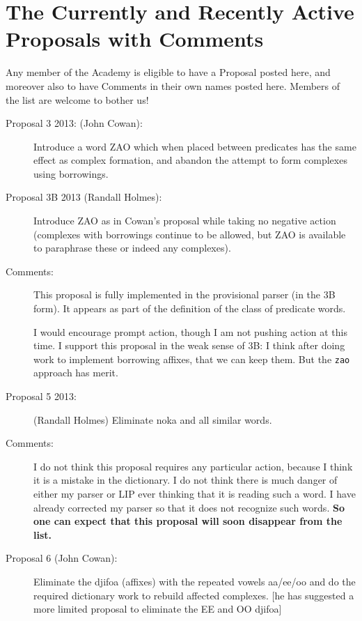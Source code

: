 \documentclass[12pt]{article}
\begin{document}
\section{The Currently and Recently Active Proposals with Comments}

Any member of the Academy is eligible to have a Proposal posted here, and moreover also to have Comments in their own names posted here.  Members of the list are welcome to bother us!

\begin{description}

\item[Proposal 3 2013: (John Cowan):]  Introduce a word ZAO
 which when placed between 
predicates has the same effect as complex formation,
 and abandon 
the attempt to form complexes using borrowings.

\item[Proposal 3B 2013 (Randall Holmes):]   Introduce ZAO 
as in Cowan's proposal while
 taking no negative action 
(complexes with borrowings continue to be allowed, 
but ZAO is available to paraphrase 
these or indeed any complexes).

\item[Comments:]   This proposal is fully implemented in the provisional parser (in the 3B form).  It appears
as part of the definition of the class of predicate words.

I would encourage prompt action, though I am not pushing action at this time.  I support this proposal in the weak sense of 3B:
I think after doing work to implement borrowing affixes, that we can keep them.  But the {\tt zao} approach has merit.


\item[Proposal 5 2013:]  (Randall Holmes)  Eliminate noka 
and all similar words.

\item[Comments:]  I do not think this proposal requires any particular action, because I think it is a mistake in the dictionary.  I do not
think there is much danger of either my parser or LIP ever thinking that it is reading such a word.   I have already corrected my parser so that it does not recognize such words. {\bf  So one can expect that this proposal will soon disappear from the list.}


\item[Proposal 6 (John Cowan):]  Eliminate the djifoa (affixes) 
with the repeated vowels aa/ee/oo and do the required 
dictionary work to rebuild affected complexes.
[he has suggested a more limited proposal to 
eliminate the EE and OO djifoa]


\end{description}
\end{document}
